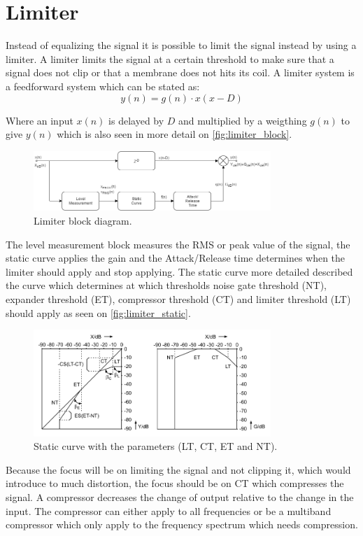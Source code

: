 \section{Limiter}
Instead of equalizing the signal it is possible to limit the signal instead by using a limiter. A limiter limits the signal at a certain threshold to make sure that a signal does not clip or that a membrane does not hits its coil. A limiter system is a feedforward system which can be stated as:
\begin{equation}
y(n) = g(n)\cdot x(x-D)
\end{equation}

Where an input $x(n)$ is delayed by $D$ and multiplied by a weigthing $g(n)$ to give $y(n)$ which is also seen in more detail on \autoref{fig:limiter_block}.
  

\begin{figure}[H]
\centering
\includegraphics[width=0.8\textwidth]{figures/Limiter_block.png}
\caption{Limiter block diagram.}
\label{fig:limiter_block}
\end{figure}   


The level measurement block measures the RMS or peak value of the signal, the static curve applies the gain and the Attack/Release time determines when the limiter should apply and stop applying. The static curve more detailed described the curve which determines at which thresholds noise gate threshold (NT), expander threshold (ET), compressor threshold (CT) and limiter threshold (LT) should apply as seen on \autoref{fig:limiter_static}.

\begin{figure}[H]
\centering
\includegraphics[width=0.8\textwidth]{figures/limiter_static_curve.png}
\caption{Static curve with the parameters (LT, CT, ET and NT).}
\label{fig:limiter_static}
\end{figure}  

Because the focus will be on limiting the signal and not clipping it, which would introduce to much distortion, the focus should be on CT which compresses the signal. A compressor decreases the change of output relative to the change in the input. The compressor can either apply to all frequencies or be a multiband compressor which only apply to the frequency spectrum which needs compression. 

      